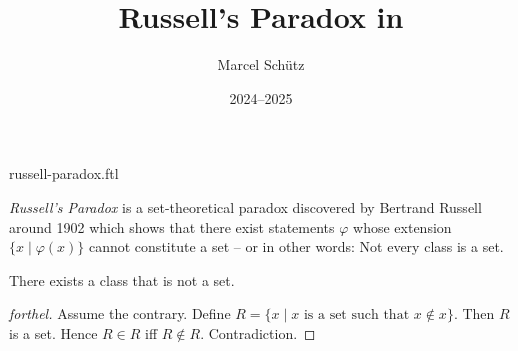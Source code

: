 \documentclass{article}
\title{Russell's Paradox in \Naproche}
\author{Marcel Schütz}
\date{2024--2025}
\begin{document}
\begin{smodule}{russell-paradox.ftl}
\maketitle


\noindent \emph{Russell's Paradox} is a set-theoretical paradox discovered by
Bertrand Russell around 1902 \cite[chapter XV]{Frege1980} which shows that 
there exist statements $\varphi$ whose extension
$\{x\mid\varphi(x)\}$ cannot constitute a set -- or in other words:
Not every class is a set.

\begin{forthel}
  \begin{theorem}[title=Russell's Paradox]
    There exists a class that is not a set.
  \end{theorem}
  \begin{proof}[forthel]
    Assume the contrary.
    Define $R = \{x \mid x \text{ is a set such that } x \notin x\}$.
    Then $R$ is a set.
    Hence $R \in R$ iff $R \notin R$.
    Contradiction.
  \end{proof}
\end{forthel}

\printbibliography
{}
\end{smodule}
\end{document}
